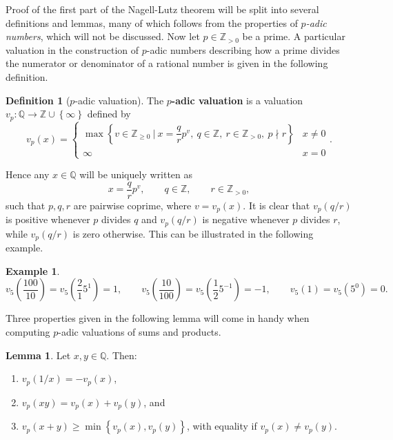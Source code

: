 \documentclass{article}
\newcommand{\Z}{\mathbb{Z}}
\newcommand{\Q}{\mathbb{Q}}
\newcommand{\rb}[1]{\left( #1 \right)}
\newcommand{\cb}[1]{\left\{ #1 \right\}}
\theoremstyle{definition}
\newtheorem*{definition}{Definition}
\newtheorem*{example}{Example}
\newtheorem{lemma}[proposition]{Lemma}
\begin{document}
Proof of the first part of the Nagell-Lutz theorem will be split into several definitions and lemmas, many of which follows from the properties of \emph{$ p $-adic numbers}, which will not be discussed. Now let $ p \in \Z_{> 0} $ be a prime. A particular valuation in the construction of $ p $-adic numbers describing how a prime divides the numerator or denominator of a rational number is given in the following definition.

\begin{definition}[$ p $-adic valuation]
The \textbf{$ p $-adic valuation} is a valuation $ v_p : \Q \to \Z \cup \cb{\infty} $ defined by
$$ v_p\rb{x} = \begin{cases} \max\cb{v \in \Z_{\ge 0} \ \Big| \ x = \dfrac{q}{r}p^v, \ q \in \Z, \ r \in \Z_{> 0}, \ p \nmid r} & x \ne 0 \\ \infty & x = 0 \end{cases}. $$
\end{definition}

Hence any $ x \in \Q $ will be uniquely written as
$$ x = \dfrac{q}{r}p^v, \qquad q \in \Z, \qquad r \in \Z_{> 0}, $$
such that $ p, q, r $ are pairwise coprime, where $ v = v_p\rb{x} $. It is clear that $ v_p\rb{q / r} $ is positive whenever $ p $ divides $ q $ and $ v_p\rb{q / r} $ is negative whenever $ p $ divides $ r $, while $ v_p\rb{q / r} $ is zero otherwise. This can be illustrated in the following example.

\begin{example}
$$ v_5\rb{\dfrac{100}{10}} = v_5\rb{\dfrac{2}{1}5^1} = 1, \qquad v_5\rb{\dfrac{10}{100}} = v_5\rb{\dfrac{1}{2}5^{-1}} = -1, \qquad v_5\rb{1} = v_5\rb{5^0} = 0. $$
\end{example}

Three properties given in the following lemma will come in handy when computing $ p $-adic valuations of sums and products.

\begin{lemma}
Let $ x, y \in \Q $. Then:
\begin{enumerate}
\item $ v_p\rb{1 / x} = -v_p\rb{x} $,
\item $ v_p\rb{xy} = v_p\rb{x} + v_p\rb{y} $, and
\item $ v_p\rb{x + y} \ge \min\cb{v_p\rb{x}, v_p\rb{y}} $, with equality if $ v_p\rb{x} \ne v_p\rb{y} $.
\end{enumerate}
\end{lemma}
\end{document}
